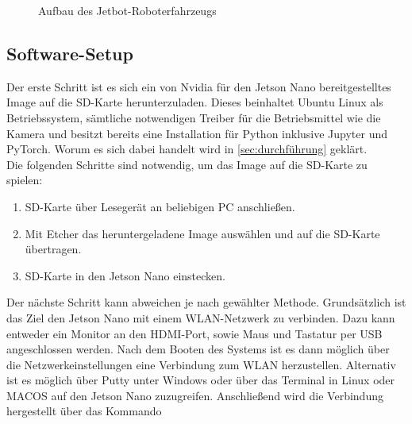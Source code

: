 \begin{figure}[H]
    \centering
    \caption[Aufbau Jetbot]{Aufbau des Jetbot-Roboterfahrzeugs}
    \label{fig:Bild3.3}
\end{figure}

\subsection{Software-Setup}

Der erste Schritt ist es sich ein von Nvidia für den Jetson Nano bereitgestelltes Image auf die SD-Karte herunterzuladen. Dieses beinhaltet Ubuntu Linux als Betriebssystem, sämtliche notwendigen Treiber für die Betriebsmittel wie \zB die Kamera und besitzt bereits eine Installation für Python inklusive Jupyter und PyTorch. Worum es sich dabei handelt wird in \autoref{sec:durchführung} geklärt.\\
Die folgenden Schritte sind notwendig, um das Image auf die SD-Karte zu spielen:

\begin{enumerate}
    \item SD-Karte über Lesegerät an beliebigen PC anschließen.
    \item Mit Etcher das heruntergeladene Image auswählen und auf die SD-Karte übertragen.
    \item SD-Karte in den Jetson Nano einstecken.
\end{enumerate}

Der nächste Schritt kann abweichen je nach gewählter Methode. Grundsätzlich ist das Ziel den Jetson Nano mit einem WLAN-Netzwerk zu verbinden. Dazu kann entweder ein Monitor an den HDMI-Port, sowie Maus und Tastatur per USB angeschlossen werden. Nach dem Booten des Systems ist es dann möglich über die Netzwerkeinstellungen eine Verbindung zum WLAN herzustellen. Alternativ ist es möglich über \zB Putty unter Windows oder über das Terminal in Linux oder MACOS auf den Jetson Nano zuzugreifen. Anschließend wird die Verbindung hergestellt über das Kommando\\

